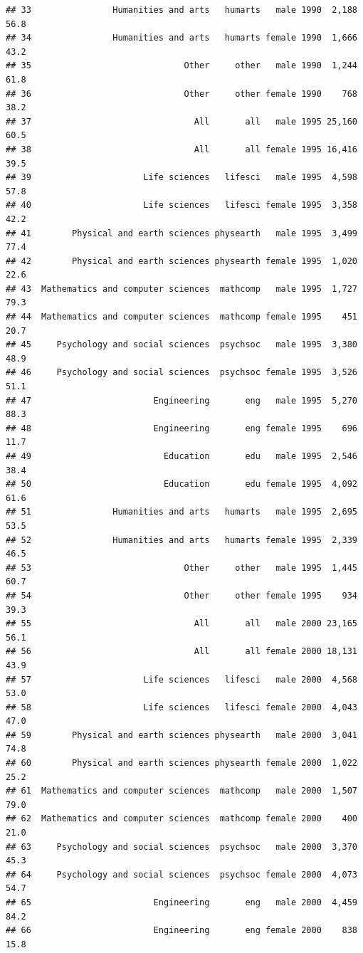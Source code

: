 \documentclass[]{article}
\begin{document}
\begin{verbatim}
## 33                Humanities and arts   humarts   male 1990  2,188    56.8
## 34                Humanities and arts   humarts female 1990  1,666    43.2
## 35                              Other     other   male 1990  1,244    61.8
## 36                              Other     other female 1990    768    38.2
## 37                                All       all   male 1995 25,160    60.5
## 38                                All       all female 1995 16,416    39.5
## 39                      Life sciences   lifesci   male 1995  4,598    57.8
## 40                      Life sciences   lifesci female 1995  3,358    42.2
## 41        Physical and earth sciences physearth   male 1995  3,499    77.4
## 42        Physical and earth sciences physearth female 1995  1,020    22.6
## 43  Mathematics and computer sciences  mathcomp   male 1995  1,727    79.3
## 44  Mathematics and computer sciences  mathcomp female 1995    451    20.7
## 45     Psychology and social sciences  psychsoc   male 1995  3,380    48.9
## 46     Psychology and social sciences  psychsoc female 1995  3,526    51.1
## 47                        Engineering       eng   male 1995  5,270    88.3
## 48                        Engineering       eng female 1995    696    11.7
## 49                          Education       edu   male 1995  2,546    38.4
## 50                          Education       edu female 1995  4,092    61.6
## 51                Humanities and arts   humarts   male 1995  2,695    53.5
## 52                Humanities and arts   humarts female 1995  2,339    46.5
## 53                              Other     other   male 1995  1,445    60.7
## 54                              Other     other female 1995    934    39.3
## 55                                All       all   male 2000 23,165    56.1
## 56                                All       all female 2000 18,131    43.9
## 57                      Life sciences   lifesci   male 2000  4,568    53.0
## 58                      Life sciences   lifesci female 2000  4,043    47.0
## 59        Physical and earth sciences physearth   male 2000  3,041    74.8
## 60        Physical and earth sciences physearth female 2000  1,022    25.2
## 61  Mathematics and computer sciences  mathcomp   male 2000  1,507    79.0
## 62  Mathematics and computer sciences  mathcomp female 2000    400    21.0
## 63     Psychology and social sciences  psychsoc   male 2000  3,370    45.3
## 64     Psychology and social sciences  psychsoc female 2000  4,073    54.7
## 65                        Engineering       eng   male 2000  4,459    84.2
## 66                        Engineering       eng female 2000    838    15.8

\end{verbatim}
\end{document}
